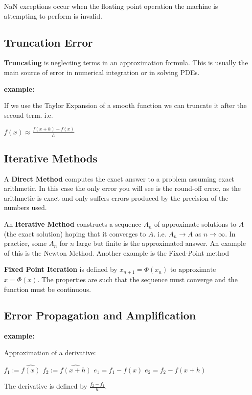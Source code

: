 \documentclass{article}
\newcommand{\n}{\newline}
\begin{document}
\begin{flushleft}
	 NaN exceptions occur when the floating point operation the machine is attempting to perform is invalid. \n
	 
	 \subsection{Truncation Error}
	 
	 \textbf{Truncating} is neglecting terms in an approximation formula.  This is usually the main source of error in numerical integration or in solving PDEs.  \n
	 
	 \textbf{example:}
	 
	 If we use the Taylor Expansion of a smooth function we can truncate it after the second term.  i.e. \n
	 
	 $f(x)\approx\frac{f(x+h)-f(x)}{h}$\n
	 
	 \subsection{Iterative Methods}
	 
	 A \textbf{Direct Method} computes the exact answer to a problem assuming exact arithmetic.  In this case the only error you will see is the round-off error, as the arithmetic is exact and only suffers errors produced by the precision of the numbers used.  \n
	 
	 An \textbf{Iterative Method} constructs a sequence $A_{n}$ of approximate solutions to $A$ (the exact solution) hoping that it converges to $A$.  i.e. $A_{n}\rightarrow A$ as $n\rightarrow\infty$.  In practice, some $A_{n}$ for $n$ large but finite is the approximated answer.  An example of this is the Newton Method. Another example is the Fixed-Point method\n
	 
	 \textbf{Fixed Point Iteration} is defined by $x_{n+1}=\Phi(x_{n})$ to approximate $x=\Phi(x)$.  The properties are such that the sequence must converge and the function must be continuous. \n
	 
	\subsection{Error Propagation and Amplification}
	
	\textbf{example:\n}
	
	Approximation of a derivative:\n
	
	$f_{1}:=\hat{f(x)}$ $f_{2}:=\hat{f(x+h)}$ \n
	$e_{1}=f_{1}-f(x)$ $e_{2}=f_{2}-f(x+h)$ \
	
	The derivative is defined by $\frac{f_{2}-f_{1}}{h}$.\n
	

\end{flushleft}
\end{document}
